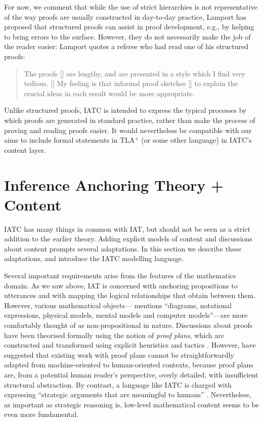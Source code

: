 \documentclass[smallextended,oneside]{svjour3}       %
\let\cite\citep
\newcommand\nothing[1]{#1}
\let\thesis\nothing
\let\paragraph\nothing
\begin{document}
For now, we comment that while the use of strict hierarchies
is not representative of the way proofs are usually
constructed in day-to-day practice, Lamport has proposed that
structured proofs can assist in proof development, e.g., by helping to
bring errors to the surface.  However, they do not necessarily make the job of
the reader easier: Lamport \citeyearpar[p.~20]{lamport2012write21st} quotes a
referee who had read one of his structured proofs:
\begin{quote}
The proofs [\lips] are lengthy, and are presented in a style which I
find very tedious.  [\lips] My feeling is that informal proof sketches
[\lips] to explain the crucial ideas in each result would be more
appropriate.
\end{quote}
Unlike structured proofs, IATC is intended to express the typical processes
by which proofs are generated in standard practice, rather than
make the process of proving and reading proofs easier.
It would nevertheless be compatible with our
aims to include formal statements in {TLA}$^{+}$ (or some other
language) in IATC's content layer.

\section{Inference Anchoring Theory + Content}\label{iatc}

\thesis{IATC has many things in common with IAT, but should not be
  seen as a strict addition to the earlier theory.}  Adding explicit
models of content and discussions about content prompts several adaptations.  In this section
we describe these adaptations, and introduce the IATC
modelling language.

\paragraph{Several important requirements arise from the features of the mathematics domain.}
As we saw above, IAT is concerned with anchoring propositions to
utterances and with mapping the logical relationships that obtain
between them.  However, various mathematical objects---\citet{larvor2012think} mentions ``diagrams, notational expressions,
physical models, mental models and computer models''---are more
comfortably thought of as non-propositional in nature.  
Discussions about proofs have been theorised
formally using the notion of \emph{proof plans}, which are constructed
and transformed using explicit heuristics and tactics
\cite{bundy1988use}.  However,
\citet[pp.~63-64]{fiedler2007argumentation} have suggested that
existing work with proof plans cannot be straightforwardly adapted
from machine-oriented to human-oriented contexts, because proof plans
are, from a potential human reader's perspective, overly detailed,
with insufficient structural abstraction.  By contrast, a language like
IATC is charged with expressing ``strategic arguments that are
meaningful to humans'' \cite[p.~68]{fiedler2007argumentation}.
Nevertheless, as important as strategic reasoning is, low-level
mathematical content seems to be even more fundamental.
\end{document}
